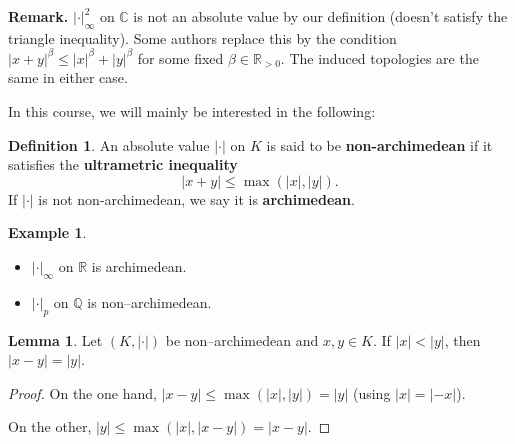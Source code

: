 \documentclass{article}
\theoremstyle{definition}
\newtheorem{lemma}[theorem]{Lemma}
\newtheorem{example}{Example}[section]
\newtheorem{defn}{Definition}[section]
\begin{document}
\textbf{Remark.} $|\cdot|_{\infty}^2$ on $\mathbb{C}$ is not an absolute value by our definition (doesn't satisfy the triangle inequality). Some authors replace this by the condition $|x+y|^{\beta} \le |x|^{\beta} + |y|^{\beta}$ for some fixed $\beta \in \mathbb{R}_{>0}$. The induced topologies are the same in either case.

In this course, we will mainly be interested in the following:

\begin{defn}
    An absolute value $|\cdot|$ on $K$ is said to be \textbf{non-archimedean} if it satisfies the \textbf{ultrametric inequality} \[
    |x+y|\le \max(|x|,|y|).
    \]
    If $|\cdot|$ is not non-archimedean, we say it is \textbf{archimedean}. 
\end{defn}
\begin{example}
    \begin{itemize}
        \item $|\cdot|_{\infty}$ on $\mathbb{R}$ is archimedean.
        \item $|\cdot|_{p}$ on $\mathbb{Q}$ is non--archimedean.
    \end{itemize}
\end{example}

\begin{lemma}
    Let $(K, |\cdot|)$ be non--archimedean and $x,y \in K$. If $|x|<|y|$, then $|x-y|= |y|$.
\end{lemma}
\begin{proof}
    On the one hand, $|x-y|\le \max(|x|,|y|) = |y|$ (using $|x|=|-x|$).
    \vspace{1mm}
     
    On the other, $|y| \le \max(|x|, |x-y|) = |x-y|$.
\end{proof}
\end{document}
